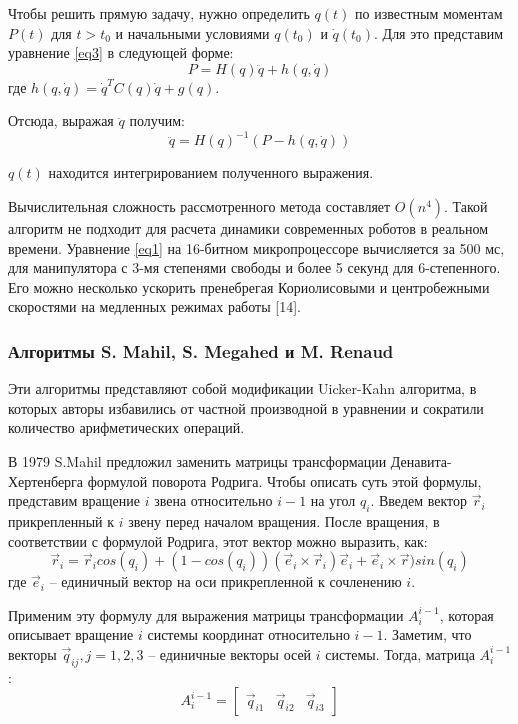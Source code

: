 Чтобы решить прямую задачу, нужно определить $q(t)$ по известным моментам $P(t)$ для $t > t_0$ и начальными условиями $q(t_0)$ и $\dot q(t_0)$. Для это представим уравнение \ref{eq3} в следующей форме:
\begin{equation}
P = H(q) \ddot q + h(q, \dot q)
\end{equation}
где $h(q, \dot q) = \dot q^T C(q) \dot q + g(q)$.

Отсюда, выражая $\ddot q$ получим:
\begin{equation}
\ddot q = H(q)^{-1} (P - h(q, \dot q))
\end{equation}

$q(t)$ находится интегрированием полученного выражения.

Вычислительная сложность рассмотренного метода составляет $O(n^4)$. Такой алгоритм не подходит для расчета динамики современных роботов в реальном времени. Уравнение \ref{eq1} на 16-битном микропроцессоре вычисляется за 500 мс, для манипулятора с 3-мя степенями свободы и более 5 секунд для 6-степенного. Его можно несколько ускорить пренебрегая Кориолисовыми и центробежными скоростями на медленных режимах работы [14].

\subsubsection{Алгоритмы S. Mahil, S. Megahed и M. Renaud}
Эти алгоритмы представляют собой модификации Uicker-Kahn алгоритма, в которых авторы избавились от частной производной в уравнении и сократили количество арифметических операций.

В 1979 S.Mahil предложил заменить матрицы трансформации Денавита-Хертенберга формулой поворота Родрига. Чтобы описать суть этой формулы, представим вращение $i$ звена относительно $i-1$ на угол $q_i$. Введем вектор $\vec r_i$ прикрепленный к $i$ звену перед началом вращения. После вращения, в соответствии с формулой Родрига, этот вектор можно выразить, как:
\begin{equation}
\vec r_i = \vec r_i cos (q_i) + (1 - cos(q_i))(\vec e_i \times \vec r_i) \vec e_i + \vec e_i \times \vec r) sin (q_i)
\end{equation}
где $\vec e_i$ -- единичный вектор на оси прикрепленной к сочленению $i$.
 
Применим эту формулу для выражения матрицы трансформации $A_i^{i-1}$, которая описывает вращение $i$ системы координат относительно $i-1$. Заметим, что векторы $\vec q_{ij}, j=1,2,3$ -- единичные векторы осей $i$ системы. Тогда, матрица $A_i^{i-1}$:
\begin{equation}
A_i^{i-1} = 
\begin{bmatrix}
\vec q_{i1} & \vec q_{i2} & \vec q_{i3}
\end{bmatrix}
\end{equation}

